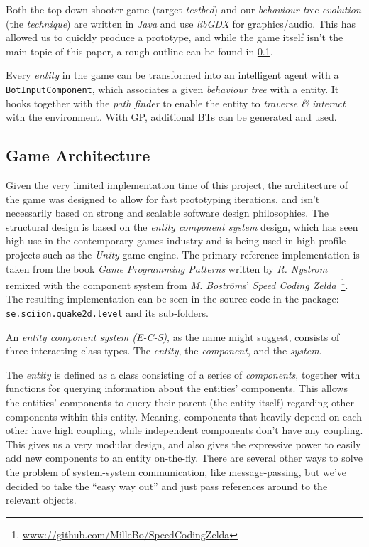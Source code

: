 \documentclass[a4paper, twocolumn]{article}
\begin{document}
        Both the top-down shooter game (target \emph{testbed}) and our \emph{behaviour tree evolution} (the \emph{technique}) are written in \emph{Java} and use \emph{libGDX} for graphics/audio. This has allowed us to quickly produce a prototype, and while the game itself isn't the main topic of this paper, a rough outline can be found in \cref{sec:game_architecture}.

        Every \emph{entity} in the game can be transformed into an intelligent agent with a \texttt{BotInputComponent}, which associates a given \emph{behaviour tree} with a entity. It hooks together with the \emph{path finder} to enable the entity to \emph{traverse \& interact} with the environment. With GP, additional BTs can be generated and used.

        \subsection{Game Architecture} \label{sec:game_architecture}

        Given the very limited implementation time of this project, the architecture of the game was designed to allow for fast prototyping iterations, and isn't necessarily based on strong and scalable software design philosophies. The structural design is based on the \textit{entity component system} design, which has seen high use in the contemporary games industry and is being used in high-profile projects such as the \textit{Unity} game engine. The primary reference implementation is taken from the book \textit{Game Programming Patterns} written by \textit{R. Nystrom}~\cite{nystrom2014game} remixed with the component system from \textit{M. Boström}s' \textit{Speed Coding Zelda}~\footnote{\url{www://github.com/MilleBo/SpeedCodingZelda}}. The resulting implementation can be seen in the source code in the package: \texttt{se.sciion.quake2d.level} and its sub-folders.

        An \textit{entity component system (E-C-S)}, as the name might suggest, consists of three interacting class types. The \textit{entity}, the \textit{component}, and the \textit{system}.

        The \emph{entity} is defined as a class consisting of a series of \emph{components}, together with functions for querying information about the entities' components. This allows the entities' components to query their parent (the entity itself) regarding other components within this entity. Meaning, components that heavily depend on each other have high coupling, while independent components don't have any coupling. This gives us a very modular design, and also gives the expressive power to easily add new components to an entity on-the-fly. There are several other ways to solve the problem of system-system communication, like message-passing, but we've decided to take the ``easy way out'' and just pass references around to the relevant objects.
\end{document}
